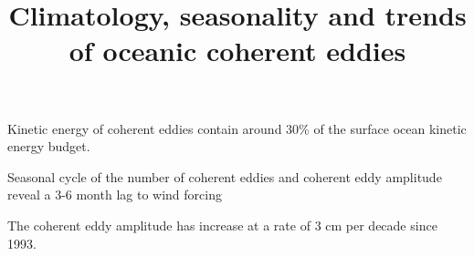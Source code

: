 \documentclass[draft,linenumbers]{agujournal2019}
\begin{document}
\title{Climatology, seasonality and trends of oceanic coherent eddies}



\begin{keypoints}
	\item Kinetic energy of coherent eddies 
	contain around 30\% of the 
	surface ocean kinetic energy budget.
	\item Seasonal cycle of the number of coherent eddies and 
	coherent eddy amplitude reveal a 3-6 month lag to wind forcing
	\item The coherent eddy amplitude has increase at 
	a rate of 3 cm per decade since 1993.
\end{keypoints}
\end{document}
